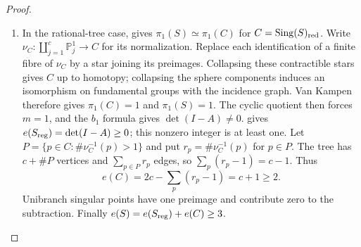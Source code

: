 \begin{proof}
\begin{enumerate}[label=\arabic*.,leftmargin=*]
\item In the rational-tree case, 
gives $\pi_1(S)\simeq\pi_1(C)$ for $C=\operatorname{Sing}(S)_{\rm red}$.
Write $\nu_C:\coprod_{j=1}^c\mathbb P^1_j\to C$ for its
normalization. Replace each identification of a finite fibre
of $\nu_C$ by a star joining its preimages. Collapsing these
contractible stars gives $C$ up to homotopy; collapsing the
sphere components induces an isomorphism on fundamental
groups with the incidence graph. Van Kampen therefore gives
$\pi_1(C)=1$ and $\pi_1(S)=1$.
The cyclic quotient then forces $m=1$, and the
$b_1$ formula gives $\det(I-A)\ne0$.
 gives
$e(S_{\rm reg})=\det(I-A)\ge0$; this nonzero integer
is at least one.
Let $P=\{p\in C:\#\nu_C^{-1}(p)>1\}$ and put
$r_p=\#\nu_C^{-1}(p)$ for $p\in P$. The tree has
$c+\#P$ vertices and $\sum_{p\in P}r_p$ edges, so
$\sum_p(r_p-1)=c-1$. Thus
\[
 e(C)=2c-\sum_p(r_p-1)=c+1\ge2.
\]
Unibranch singular points have one preimage and contribute
zero to the subtraction. Finally
$e(S)=e(S_{\rm reg})+e(C)\ge3$.

\end{enumerate}
\end{proof}